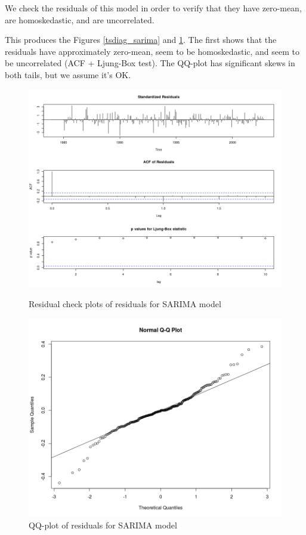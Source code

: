 \documentclass[]{article}
\begin{document}
We check the residuals of this model in order to verify that they have zero-mean, are homoskedastic, and are uncorrelated.

This produces the Figures \ref{tsdiag_sarima} and \ref{qq_sarima}. The first shows that the residuals have approximately zero-mean, seem to be homoskedastic, and seem to be uncorrelated (ACF + Ljung-Box test). The QQ-plot has significant skews in both tails, but we assume it's OK.

\begin{figure}[!ht]
\centering
\begin{minipage}{.5\textwidth}
\centering
\includegraphics[width=\linewidth]{tsdiag_sarima}
\caption{Residual check plots of residuals for SARIMA model}
\label{tsdiag_sarima}
\end{minipage}%
\begin{minipage}{.5\textwidth}
\centering
\includegraphics[width=\linewidth]{qq_sarima}
\caption{QQ-plot of residuals for SARIMA model}
\label{qq_sarima}
\end{minipage}
\end{figure}
\end{document}
